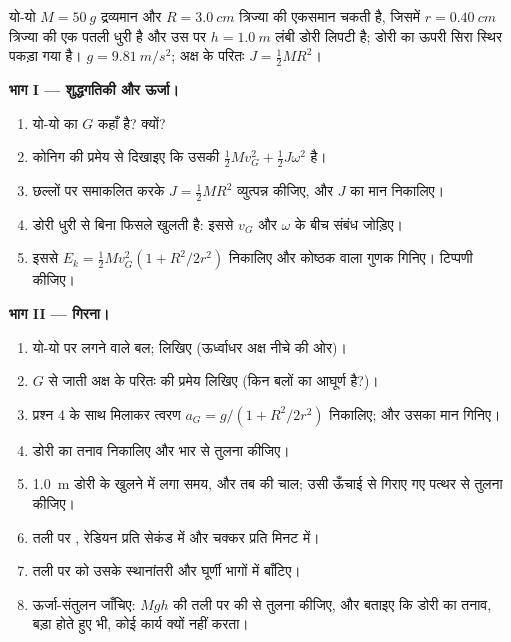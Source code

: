 \begin{problem}
\label{pb:b1:systems-of-points:1}
यो-यो $M = \qty{50}{g}$ द्रव्यमान और $R =
\qty{3.0}{cm}$ त्रिज्या की एकसमान चकती है, जिसमें $r = \qty{0.40}{cm}$
त्रिज्या की एक पतली धुरी है और उस पर $h = \qty{1.0}{m}$ लंबी डोरी लिपटी
है; डोरी का ऊपरी सिरा स्थिर पकड़ा गया है। $g = \qty{9.81}{m/s^2}$; अक्ष के
परितः $J = \tfrac12 MR^2$।

\medskip
\noindent\textbf{भाग I --- शुद्धगतिकी और ऊर्जा।}
\begin{enumerate}
  \item यो-यो का  $G$ कहाँ है? क्यों?
  \item कोनिग की प्रमेय से दिखाइए कि उसकी  $\tfrac12
        Mv_G^2 + \tfrac12 J\omega^2$ है।
  \item छल्लों पर समाकलित करके $J = \tfrac12 MR^2$ व्युत्पन्न कीजिए, और
        $J$ का मान निकालिए।
  \item डोरी धुरी से बिना फिसले खुलती है: इससे $v_G$ और $\omega$ के बीच
        संबंध जोड़िए।
  \item इससे $E_k = \tfrac12 Mv_G^2(1 + R^2/2r^2)$ निकालिए और कोष्ठक वाला
        गुणक गिनिए। टिप्पणी कीजिए।
\end{enumerate}

\medskip
\noindent\textbf{भाग II --- गिरना।}
\begin{enumerate}[resume]
  \item यो-यो पर लगने वाले बल;  लिखिए
        (ऊर्ध्वाधर अक्ष नीचे की ओर)।
  \item $G$ से जाती अक्ष के परितः  की प्रमेय लिखिए (किन बलों
        का आघूर्ण है?)।
  \item प्रश्न 4 के साथ मिलाकर त्वरण $a_G = g/(1 +
        R^2/2r^2)$ निकालिए; और उसका मान गिनिए।
  \item डोरी का तनाव निकालिए और भार से तुलना कीजिए।
  \item \qty{1.0}{m} डोरी के खुलने में लगा समय, और तब की चाल; उसी ऊँचाई
        से गिराए गए पत्थर से तुलना कीजिए।
  \item तली पर , रेडियन प्रति सेकंड में और चक्कर प्रति मिनट में।
  \item तली पर  को उसके स्थानांतरी और घूर्णी भागों में बाँटिए।
  \item ऊर्जा-संतुलन जाँचिए: $Mgh$ की तली पर की  से तुलना
        कीजिए, और बताइए कि डोरी का तनाव, बड़ा होते हुए भी, कोई कार्य
        क्यों नहीं करता।
\end{enumerate}


\end{problem}
